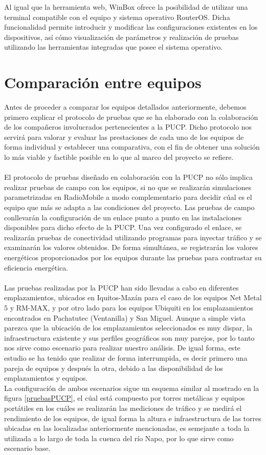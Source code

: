 		Al igual que la herramienta web, WinBox ofrece la posibilidad de utilizar una terminal compatible con el equipo y sistema operativo RouterOS. Dicha funcionalidad permite introducir y modificar las configuraciones existentes en los dispositivos, así cómo visualización de parámetros y realización de pruebas utilizando las herramientas integradas que posee el sistema operativo.
		
\section{Comparación entre equipos}	
Antes de proceder a comparar los equipos detallados anteriormente, debemos primero explicar el protocolo de pruebas que se ha elaborado con la colaboración de los compañeros involucrados pertenecientes a la PUCP. Dicho protocolo nos servirá para valorar y evaluar las prestaciones de cada uno de los equipos de forma individual y establecer una comparativa, con el fin de obtener una solución lo más viable y factible posible en lo que al marco del proyecto se refiere. \\\\

 El protocolo de pruebas diseñado en colaboración con la PUCP no sólo implica realizar pruebas de campo con los equipos, si no que se realizarán simulaciones parametrizadas en RadioMobile a modo complementario para decidir cúal es el equipo que más se adapta a las condiciones del proyecto. Las pruebas de campo conllevarán la configuración de un enlace punto a punto en las instalaciones disponibles para dicho efecto de la PUCP. Una vez configurado el enlace, se realizarán pruebas de conectividad utilizando programas para inyectar tráfico y se examinarán los valores obtenidos. De forma simultánea, se registrarán los valores energéticos proporcionados por los equipos durante las pruebas para contrastar su eficiencia energética.\\\\
 
 Las pruebas realizadas por la PUCP han sido llevadas a cabo en diferentes emplazamientos, ubicados en Iquitos-Mazán para el caso de los equipos Net Metal 5 y RM-MAX, y por otro lado para los equipos Ubiquiti en los emplazamientos encontrados en Pachatutec (Ventanilla) y San Miguel. Aunque a simple vista parezca que la ubicación de los emplazamientos seleccionados es muy dispar, la infraestructura existente y sus perfiles geográficos son muy parejos, por lo tanto nos sirve como escenario para realizar nuestro análisis. De igual forma, este estudio se ha tenido que realizar de forma interrumpida, es decir primero una pareja de equipos y después la otra, debido a las disponibilidad de los emplazamientos y equipos.\\
 La configuración de ambos escenarios sigue un esquema similar al mostrado en la figura \ref{pruebasPUCP}, el cúal está compuesto por torres metálicas y equipos portátiles en los cuáles se realizarán las mediciones de tráfico y se medirá el rendimiento de los equipos, de igual forma la altura e infraestructura de las torres ubicadas en las localizadas anteriormente mencionadas, es semejante a toda la utilizada a lo largo de toda la cuenca del río Napo, por lo que sirve como escenario base.
 

